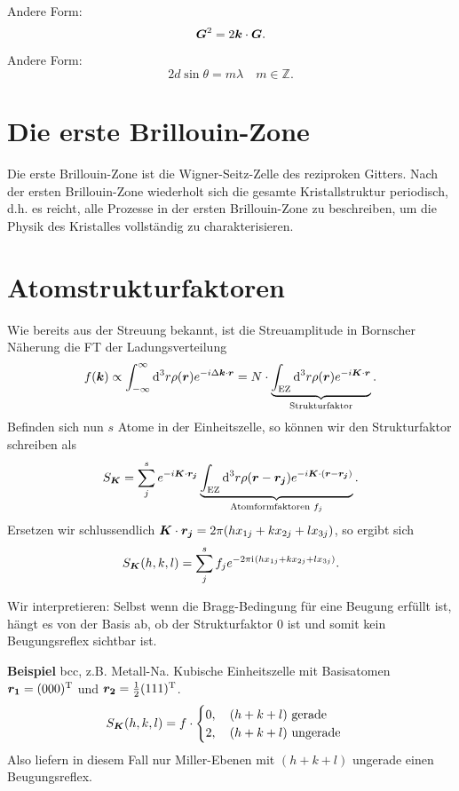 Andere Form:
\begin{equation*}
	\boldsymbol{G}^2 = 2\boldsymbol{k}\cdot\boldsymbol{G}.
\end{equation*}

Andere Form:
\begin{equation*}
	2d\sin\theta = m\lambda\quad m\in\mathbb{Z}.
\end{equation*}

\section{Die erste Brillouin-Zone}
Die erste Brillouin-Zone ist die Wigner-Seitz-Zelle des reziproken Gitters.
Nach der ersten Brillouin-Zone wiederholt sich die gesamte Kristallstruktur periodisch, d.h. es reicht, alle Prozesse in der ersten Brillouin-Zone zu beschreiben, um die Physik des Kristalles vollständig zu charakterisieren.

\section{Atomstrukturfaktoren}
Wie bereits aus der Streuung bekannt, ist die Streuamplitude in Bornscher Näherung die FT der Ladungsverteilung
\begin{equation*}
	f(\boldsymbol{k})\propto\int_{-\infty}^\infty\text{d}^3r\rho(\boldsymbol{r})e^{-i\Delta\boldsymbol{k}\cdot\boldsymbol{r}} = N\cdot\underbrace{\int_\text{EZ}\text{d}^3r\rho(\boldsymbol{r})e^{-i\boldsymbol{K}\cdot\boldsymbol{r}}}_\text{Strukturfaktor}.
\end{equation*}
Befinden sich nun $s$ Atome in der Einheitszelle, so können wir den Strukturfaktor schreiben als
\begin{equation*}
	S_{\boldsymbol{K}} = \sum_j^se^{-i\boldsymbol{K}\cdot\boldsymbol{r_j}}\underbrace{\int_\text{EZ}\text{d}^3r\rho(\boldsymbol{r}-\boldsymbol{r_j})e^{-i\boldsymbol{K}\cdot(\boldsymbol{r}-\boldsymbol{r_j})}}_\text{Atomformfaktoren $f_j$}.
\end{equation*}
Ersetzen wir schlussendlich $\boldsymbol{K}\cdot\boldsymbol{r_j} = 2\pi(hx_{1j} + kx_{2j} + lx_{3j})$, so ergibt sich
\begin{equation*}
	S_{\boldsymbol{K}}(h,k,l) = \sum_j^sf_je^{-2\pi\mathrm{i}\mkern1mu(hx_{1j} + kx_{2j} + lx_{3j})}.
\end{equation*}

Wir interpretieren:
Selbst wenn die Bragg-Bedingung für eine Beugung erfüllt ist, hängt es von der Basis ab, ob der Strukturfaktor 0 ist und somit kein Beugungsreflex sichtbar ist.

\textbf{Beispiel}  bcc, z.B. Metall-Na. Kubische Einheitszelle mit Basisatomen $\boldsymbol{r_1} = (000)^\text{T}$ und $\boldsymbol{r_2} = \frac{1}{2}(111)^\text{T}$.
\begin{equation*}
	S_{\boldsymbol{K}}(h,k,l) = f\cdot\begin{cases}
																0,\quad(h+k+l)\text{ gerade} \\
																2,\quad(h+k+l)\text{ ungerade}
															\end{cases}
\end{equation*}
Also liefern in diesem Fall nur Miller-Ebenen mit $(h+k+l)$ ungerade einen Beugungsreflex.
